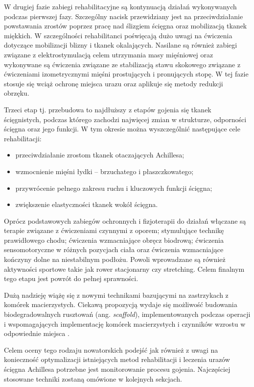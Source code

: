 W drugiej fazie zabiegi rehabilitacyjne są kontynuacją działań wykonywanych podczas pierwszej fazy. Szczególny nacisk przewidziany jest na przeciwdziałanie powstawania zrostów poprzez pracę nad ślizgiem ścięgna oraz mobilizacją tkanek miękkich. W szczególności rehabilitanci poświęcają dużo uwagi na ćwiczenia dotyczące mobilizacji blizny i tkanek okalających. Nasilane są również zabiegi związane z elektrostymulacją celem utrzymania masy mięśniowej oraz wykonywane są ćwiczenia związane ze stabilizacją stawu skokowego związane z ćwiczeniami izometrycznymi mięśni prostujących i pronujących stopę. W tej fazie stosuje się wciąż ochronę miejsca urazu oraz aplikuje się metody redukcji obrzęku.

Trzeci etap tj. przebudowa to najdłuższy z etapów gojenia się tkanek ścięgnistych, podczas którego zachodzi najwięcej zmian w strukturze, odporności ścięgna oraz jego funkcji. W tym okresie można wyszczególnić następujące cele rehabilitacji: 
\begin{itemize}
	\item przeciwdziałanie zrostom tkanek otaczających Achillesa; 
	\item wzmocnienie mięśni łydki – brzuchatego i płaszczkowatego; 
	\item przywrócenie pełnego zakresu ruchu i kluczowych funkcji ścięgna; 
	\item zwiększenie elastyczności tkanek wokół ścięgna.
\end{itemize}

Oprócz podstawowych zabiegów ochronnych i fizjoterapii do działań włączane są terapie związane z ćwiczeniami czynnymi z oporem; stymulujące technikę prawidłowego chodu; ćwiczenia wzmacniające obręcz biodrową; ćwiczenia sensomotoryczne w różnych pozycjach ciała oraz ćwiczenia wzmacniające kończyny dolne na niestabilnym podłożu. Powoli wprowadzane są również aktywności sportowe takie jak rower stacjonarny czy stretching. Celem finalnym tego etapu jest powrót do pełnej sprawności. 

Dużą nadzieję wiążę się z nowymi technikami bazującymi na zastrzykach z komórek macierzystych. Ciekawą propozycją wydaje się możliwość budowania biodegradowalnych rusztowań (ang. \textit{scaffold}), implementowanych podczas operacji i wspomagających implementację komórek macierzystych i czynników wzrostu w odpowiednie miejsca \cite{START}.

Celem oceny tego rodzaju nowatorskich podejść jak również z uwagi na konieczność optymalizacji istniejących metod rehabilitacji i leczenia urazów ścięgna Achillesa potrzebne jest monitorowanie procesu gojenia. Najczęściej stosowane techniki zostaną omówione w kolejnych sekcjach.

